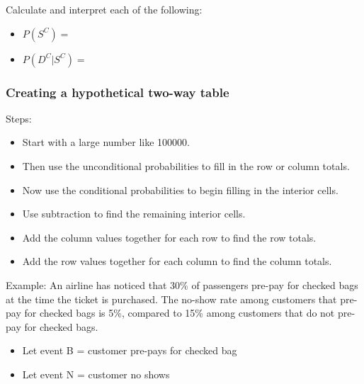 \documentclass[
]{report}
\providecommand{\tightlist}{%
  \setlength{\itemsep}{0pt}\setlength{\parskip}{0pt}}
\begin{document}
Calculate and interpret each of the following:


\begin{itemize}
\tightlist
\item
  \(P(S^C)=\)
\end{itemize}

\vspace{0.6in}

\begin{itemize}
\tightlist
\item
  \(P(D^C|S^C)=\)
\end{itemize}

\vspace{0.6in}



\subsubsection*{Creating a hypothetical two-way table}\label{creating-a-hypothetical-two-way-table}

Steps:

\begin{itemize}
\item
  Start with a large number like 100000.
\item
  Then use the unconditional probabilities to fill in the row or column totals.
\item
  Now use the conditional probabilities to begin filling in the interior cells.
\item
  Use subtraction to find the remaining interior cells.
\item
  Add the column values together for each row to find the row totals.
\item
  Add the row values together for each column to find the column totals.
\end{itemize}

Example: An airline has noticed that 30\% of passengers pre-pay for checked bags at the time the ticket is purchased. The no-show rate among customers that pre-pay for checked bags is 5\%, compared to 15\% among customers that do not pre-pay for checked bags.

\begin{itemize}
\tightlist
\item
  Let event B = customer pre-pays for checked bag
\item
  Let event N = customer no shows
\end{itemize}
\end{document}
